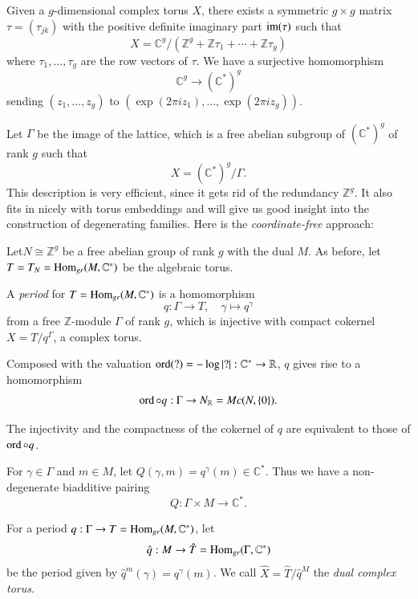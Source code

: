 Given a $g$-dimensional complex torus $X$, there exists a symmetric $g
\times  g$ matrix $\tau = (\tau_{jk})$ with the positive definite imaginary
part $\operatorname{im}(\tau)$ such that 
$$
X = \mathbb{C}^g / (\mathbb{Z}^g + \mathbb{Z} \tau_1 + \cdots +
\mathbb{Z}\tau_g) 
$$
where $\tau_1, \ldots , \tau_g$ are the row vectors of $\tau$. We have
a surjective homomorphism 
$$
\mathbb{C}^g \to (\mathbb{C}^*)^g
$$
sending $(z_1, \ldots , z_g)$ to $(\exp (2\pi i z_1), \ldots , \exp (2
\pi i z_g))$.  

\noindent
Let $\Gamma$ be the image of the lattice, which is a free abelian
subgroup of $(\mathbb{C}^*)^g$ of rank $g$ such that  
$$
X = (\mathbb{C}^*)^g/\Gamma.
$$
This description is very efficient, since it gets rid of the
redundancy $\mathbb{Z}^g$. It also fits in nicely with torus
embeddings and will give us good insight into the construction of
degenerating families. Here is the \textit{coordinate-free} approach: 

Let\pageoriginale $N \cong \mathbb{Z}^g$ be a free abelian group of
rank $g$ with the dual $M$. As before, let $T = T_N = \operatorname{Hom}_{gr}(M,
\mathbb{C}^*)$ be the algebraic torus.   

\begin{defi*}
A {\em period } for $T = \operatorname{Hom}_{gr} (M, \mathbb{C}^*)$ is a
homomorphism  
$$
q : \Gamma \to T, \quad \gamma \mapsto q^\gamma 
$$
from a free $\mathbb{Z}$-module $\Gamma$ of rank $g$, which is
injective with compact cokernel $X =  T/q^\Gamma$, a complex torus. 
\end{defi*}

Composed with the valuation $\operatorname{ord} (?) = - \log |?| :
\mathbb{C}^* \to \mathbb{R}$, $q$ gives rise to a homomorphism 
$$
\operatorname{ord} \circ q : \Gamma \to N_{\mathbb{R}} = Mc (N, \{ 0 \}). 
$$

The injectivity and the compactness of the cokernel of $q$ are
equivalent to those of $\operatorname{ord} \circ q$. 

For $\gamma \in \Gamma$ and $m \in M$, let $Q (\gamma, m) =
q^{\gamma} (m) \in \mathbb{C}^*$. Thus we have a non-degenerate
biadditive pairing 
$$
Q : \Gamma \times M \to \mathbb{C}^*.
$$

\begin{defi*}
For a period $q : \Gamma \to T = \operatorname{Hom}_{gr} (M, \mathbb{C}^*)$,
let 
$$
\hat{q} : M \to \hat{T} = \operatorname{Hom}_{gr} (\Gamma, \mathbb{C}^*) 
$$
be the period given by $\hat{q}^m (\gamma) = q^\gamma (m)$. We call
$\hat{X} = \hat{T}/\hat{q}^M$ the {\em dual complex torus}. 
\end{defi*}

